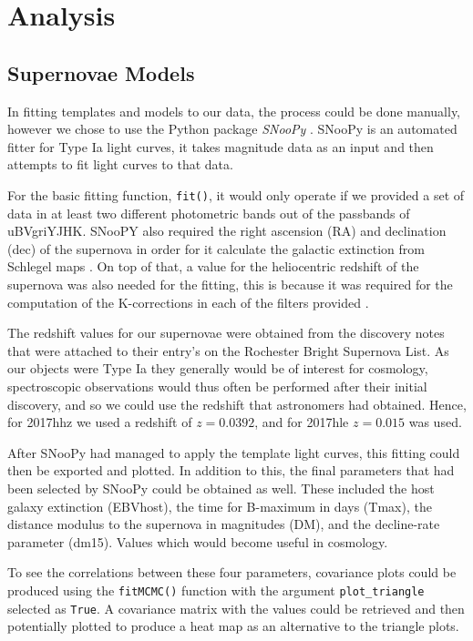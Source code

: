 \documentclass[twocolumn]{revtex4}
\begin{document}
\vspace{-3ex}
\section{Analysis}
\label{analysis}
\vspace{-2ex}
\subsection{Supernovae Models}
\label{supernovae_models}
\vspace{-2ex}
In fitting templates and models to our data, the process could be done manually, however we chose to use the Python package \textit{SNooPy} \cite{car_snoopy}. SNooPy is an automated fitter for Type Ia light curves, it takes magnitude data as an input and then attempts to fit light curves to that data.

For the basic fitting function, \texttt{fit()}, it would only operate if we provided a set of data in at least two different photometric bands out of the passbands of uBVgriYJHK. SNooPY also required the right ascension (RA) and declination (dec) of the supernova in order for it calculate the galactic extinction from Schlegel maps \cite{snoopy_docs}. On top of that, a value for the heliocentric redshift of the supernova was also needed for the fitting, this is because it was required for the computation of the K-corrections in each of the filters provided \cite{car_snoopy}.

The redshift values for our supernovae were obtained from the discovery notes that were attached to their entry's on the Rochester Bright Supernova List. As our objects were Type Ia they generally would be of interest for cosmology, spectroscopic observations would thus often be performed after their initial discovery, and so we could use the redshift that astronomers had obtained. Hence, for 2017hhz we used a redshift of $z=0.0392$, and for 2017hle $z=0.015$ was used.

After SNooPy had managed to apply the template light curves, this fitting could then be exported and plotted. In addition to this, the final parameters that had been selected by SNooPy could be obtained as well. These included the host galaxy extinction (EBVhost), the time for B-maximum in days (Tmax), the distance modulus to the supernova in magnitudes (DM), and the decline-rate parameter (dm15). Values which would become useful in cosmology.

To see the correlations between these four parameters, covariance plots could be produced using the \texttt{fitMCMC()} function with the argument \texttt{plot\_triangle} selected as \texttt{True}. A covariance matrix with the values could be retrieved and then potentially plotted to produce a heat map as an alternative to the triangle plots. 
\end{document}
